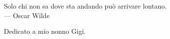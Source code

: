 
\cleardoublepage
{}
\thispagestyle{empty}

\vspace*{3cm}

\begin{center}
Solo chi non sa dove sta andando può arrivare lontano. \\ \medskip
--- Oscar Wilde    
\end{center}

\medskip

\begin{center}
Dedicato a mio nonno Gigi.
\end{center}
